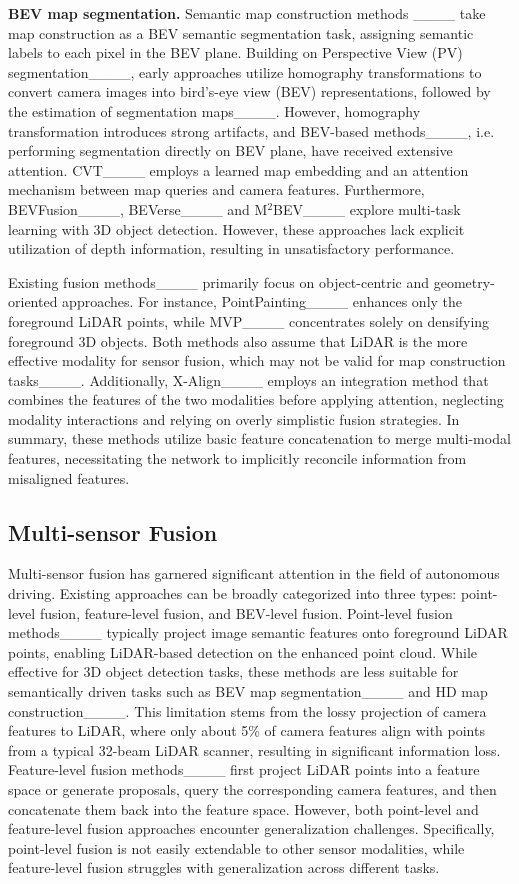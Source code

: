 \textbf{BEV map segmentation.}
Semantic map construction methods ____ take map construction as a BEV semantic segmentation task, assigning semantic labels to each pixel in the BEV plane.
Building on Perspective View (PV) segmentation____, early approaches utilize homography transformations to convert camera images into bird's-eye view (BEV) representations, followed by the estimation of segmentation maps____.
However, homography transformation introduces strong artifacts, and BEV-based methods____, i.e. performing segmentation directly on BEV plane, have received extensive attention.
CVT____ employs a learned map embedding and an attention mechanism between map queries and camera features.
Furthermore, BEVFusion____, BEVerse____ and M$^{2}$BEV____ explore
multi-task learning with 3D object detection.
However, these approaches lack explicit utilization of depth information, resulting in unsatisfactory performance.


Existing fusion methods____ primarily focus on object-centric and geometry-oriented approaches. For instance, PointPainting____ enhances only the foreground LiDAR points, while MVP____ concentrates solely on densifying foreground 3D objects. 
Both methods also assume that LiDAR is the more effective modality for sensor fusion, which may not be valid for map construction tasks____.
Additionally, X-Align____ employs an integration method that combines the features of the two modalities before applying attention, neglecting modality interactions and relying on overly simplistic fusion strategies.
In summary, these methods utilize basic feature concatenation to merge multi-modal features, necessitating the network to implicitly reconcile information from misaligned features.






\subsection{Multi-sensor Fusion}
Multi-sensor fusion has garnered significant attention in the field of autonomous driving. Existing approaches can be broadly categorized into three types: point-level fusion, feature-level fusion, and BEV-level fusion.
Point-level fusion methods____ typically project image semantic features onto foreground LiDAR points, enabling LiDAR-based detection on the enhanced point cloud. While effective for 3D object detection tasks, these methods are less suitable for semantically driven tasks such as BEV map segmentation____ and HD map construction____. This limitation stems from the lossy projection of camera features to LiDAR, where only about 5\% of camera features align with points from a typical 32-beam LiDAR scanner, resulting in significant information loss.
Feature-level fusion methods____ first project LiDAR points into a feature space or generate proposals, query the corresponding camera features, and then concatenate them back into the feature space. However, both point-level and feature-level fusion approaches encounter generalization challenges. Specifically, point-level fusion is not easily extendable to other sensor modalities, while feature-level fusion struggles with generalization across different tasks.



